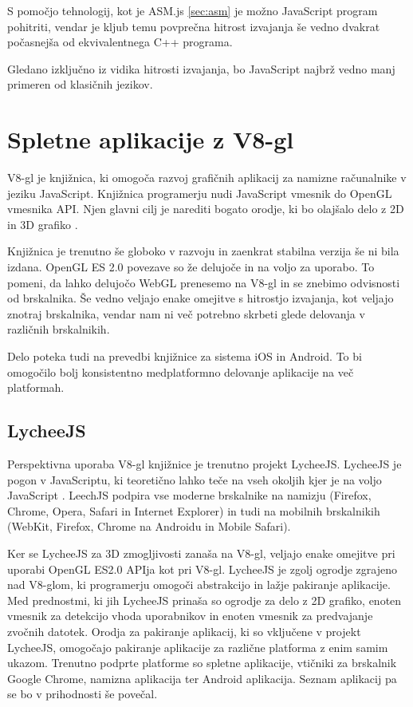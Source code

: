 S pomočjo tehnologij, kot je ASM.js \ref{sec:asm} je možno JavaScript program pohitriti, vendar je kljub temu povprečna hitrost izvajanja še vedno dvakrat počasnejša od ekvivalentnega C++ programa.

Gledano izključno iz vidika hitrosti izvajanja, bo JavaScript najbrž vedno manj primeren od klasičnih jezikov.

\section{Spletne aplikacije z V8-gl}

V8-gl je knjižnica, ki omogoča razvoj grafičnih aplikacij za namizne računalnike v jeziku JavaScript. Knjižnica programerju nudi JavaScript vmesnik do OpenGL vmesnika API. Njen glavni cilj je narediti bogato orodje, ki bo olajšalo delo z 2D in 3D grafiko \cite{v8gl}.

Knjižnica je trenutno še globoko v razvoju in zaenkrat stabilna verzija še ni bila izdana. OpenGL ES 2.0 povezave so že delujoče in na voljo za uporabo. To pomeni, da lahko delujočo WebGL prenesemo na V8-gl in se znebimo odvisnosti od brskalnika. Še vedno veljajo enake omejitve s hitrostjo izvajanja, kot veljajo znotraj brskalnika, vendar nam ni več potrebno skrbeti glede delovanja v različnih brskalnikih.

Delo poteka tudi na prevedbi knjižnice za sistema iOS in Android. To bi omogočilo bolj konsistentno medplatformno delovanje aplikacije na več platformah.

\subsection{LycheeJS}

Perspektivna uporaba V8-gl knjižnice je trenutno projekt LycheeJS. LycheeJS je pogon v JavaScriptu, ki teoretično lahko teče na vseh okoljih kjer je na voljo JavaScript  \cite{lycheejs}. LeechJS podpira vse moderne brskalnike na namizju (Firefox, Chrome, Opera, Safari in Internet Explorer) in tudi na mobilnih brskalnikih (WebKit, Firefox, Chrome na Androidu in Mobile Safari). 

Ker se LycheeJS za 3D zmogljivosti zanaša na V8-gl, veljajo enake omejitve pri uporabi OpenGL ES2.0 APIja kot pri V8-gl. LycheeJS je zgolj ogrodje zgrajeno nad V8-glom, ki programerju omogoči abstrakcijo in lažje pakiranje aplikacije. Med prednostmi, ki jih LycheeJS prinaša so ogrodje za delo z 2D grafiko, enoten vmesnik za detekcijo vhoda uporabnikov in enoten vmesnik za predvajanje zvočnih datotek. Orodja za pakiranje aplikacij, ki so vključene v projekt LycheeJS, omogočajo pakiranje aplikacije za različne platforma z enim samim ukazom. Trenutno podprte platforme so spletne aplikacije, vtičniki za brskalnik Google Chrome, namizna aplikacija ter Android aplikacija. Seznam aplikacij pa se bo v prihodnosti še povečal.

